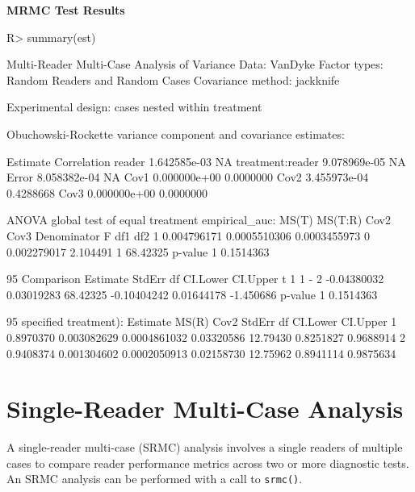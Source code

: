 \documentclass[
]{jss}
\begin{document}
\textbf{MRMC Test Results}

\begin{CodeChunk}
\begin{CodeInput}
R> summary(est)
\end{CodeInput}
\begin{CodeOutput}
Multi-Reader Multi-Case Analysis of Variance
Data: VanDyke
Factor types: Random Readers and Random Cases
Covariance method: jackknife

Experimental design: cases nested within treatment 

Obuchowski-Rockette variance component and covariance estimates:

                     Estimate Correlation
reader           1.642585e-03          NA
treatment:reader 9.078969e-05          NA
Error            8.058382e-04          NA
Cov1             0.000000e+00   0.0000000
Cov2             3.455973e-04   0.4288668
Cov3             0.000000e+00   0.0000000


ANOVA global test of equal treatment empirical_auc:
        MS(T)      MS(T:R)         Cov2 Cov3 Denominator        F df1      df2
1 0.004796171 0.0005510306 0.0003455973    0 0.002279017 2.104491   1 68.42325
    p-value
1 0.1514363


95%
  Comparison    Estimate     StdErr       df    CI.Lower    CI.Upper         t
1      1 - 2 -0.04380032 0.03019283 68.42325 -0.10404242  0.01644178 -1.450686
    p-value
1 0.1514363


95%
specified treatment):
   Estimate       MS(R)         Cov2     StdErr       df  CI.Lower  CI.Upper
1 0.8970370 0.003082629 0.0004861032 0.03320586 12.79430 0.8251827 0.9688914
2 0.9408374 0.001304602 0.0002050913 0.02158730 12.75962 0.8941114 0.9875634
\end{CodeOutput}
\end{CodeChunk}

\hypertarget{single-reader-multi-case-analysis}{%
\section{Single-Reader Multi-Case
Analysis}\label{single-reader-multi-case-analysis}}

A single-reader multi-case (SRMC) analysis involves a single readers of
multiple cases to compare reader performance metrics across two or more
diagnostic tests. An SRMC analysis can be performed with a call to
\texttt{srmc()}.
\end{document}
